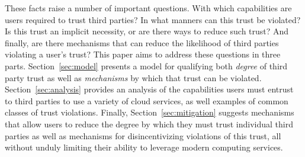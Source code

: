 These facts raise a number of important questions. With which
capabilities are users required to trust third parties? In what
manners can this trust be violated? Is this trust an implicit
necessity, or are there ways to reduce such trust? And finally, are
there mechanisms that can reduce the likelihood of third parties
violating a user's trust? This paper aims to address these questions
in three parts. Section~\ref{sec:model} presents a model for
qualifying both \emph{degree} of third party trust as well as
\emph{mechanisms} by which that trust can be violated.
Section~\ref{sec:analysis} provides an analysis of the capabilities
users must entrust to third parties to use a variety of cloud
services, as well examples of common classes of trust
violations. Finally, Section~\ref{sec:mitigation} suggests mechanisms
that allow users to reduce the degree by which they must trust
individual third parties as well as mechanisms for disincentivizing
violations of this trust, all without unduly limiting their ability to
leverage modern computing services.
